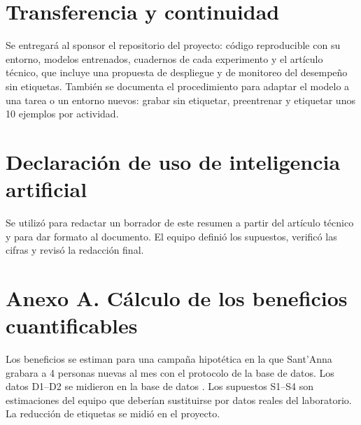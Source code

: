 \documentclass[letterpaper,11pt]{article}
\begin{document}
\section*{Transferencia y continuidad}
Se entregará al sponsor el repositorio del proyecto: código reproducible con su entorno, modelos entrenados, cuadernos de cada experimento y el artículo técnico, que incluye una propuesta de despliegue y de monitoreo del desempeño sin etiquetas. También se documenta el procedimiento para adaptar el modelo a una tarea o un entorno nuevos: grabar sin etiquetar, preentrenar y etiquetar unos 10 ejemplos por actividad.

\section*{Declaración de uso de inteligencia artificial}
Se utilizó \textcite{anthropic2026claude} para redactar un borrador de este resumen a partir del artículo técnico y para dar formato al documento. El equipo definió los supuestos, verificó las cifras y revisó la redacción final. 

\printbibliography[title={Referencias}]

\clearpage
\section*{Anexo A. Cálculo de los beneficios cuantificables}
Los beneficios se estiman para una campaña hipotética en la que Sant'Anna grabara a 4 personas nuevas al mes con el protocolo de la base de datos. Los datos D1--D2 se midieron en la base de datos \parencite{bassani2021dataset}. Los supuestos S1--S4 son estimaciones del equipo que deberían sustituirse por datos reales del laboratorio. La reducción de etiquetas se midió en el proyecto.
\end{document}
